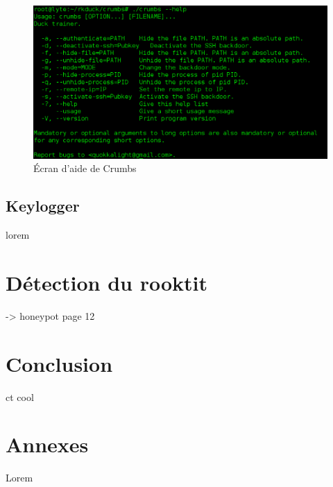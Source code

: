 \documentclass[11pt]{article}
\begin{document}
        \begin{figure}[H] 
        \begin{center}
        \includegraphics[scale=0.5]{./img/crumbs-help.png}

        \caption[dsfsdf]{Écran d'aide de Crumbs}
        \end{center}
        \end{figure}

    \subsection{Keylogger}
        lorem
        
\section{Détection du rooktit}
    
    -> honeypot page 12
    
            

\section*{Conclusion}
    ct cool

\section*{Annexes}
    Lorem



\end{document}
